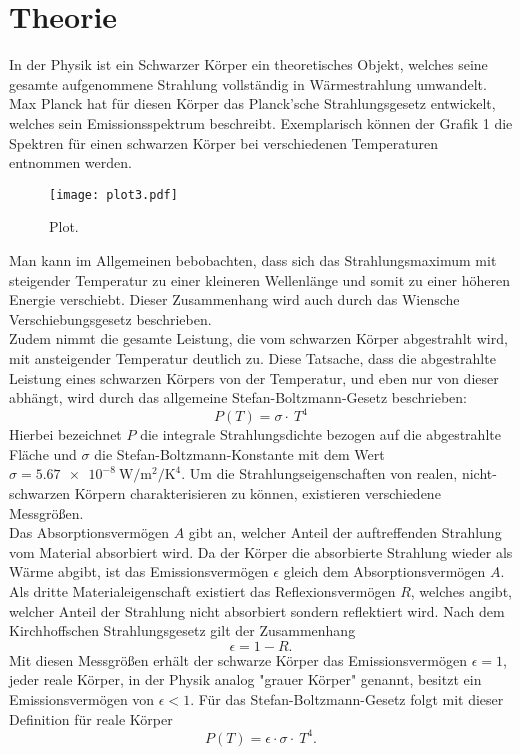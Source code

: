 \section{Theorie}
\label{sec:Theorie}
In der Physik ist ein Schwarzer Körper ein theoretisches Objekt, welches seine gesamte aufgenommene Strahlung vollständig in Wärmestrahlung umwandelt.
Max Planck hat für diesen Körper das Planck'sche Strahlungsgesetz entwickelt, welches sein Emissionsspektrum beschreibt.
Exemplarisch können der Grafik 1 die Spektren für einen schwarzen Körper bei verschiedenen Temperaturen entnommen werden.
\begin{figure}[H]
  \centering
  \texttt{[image: plot3.pdf]}
  \caption{Plot.}
  \label{fig:plot}
\end{figure}
Man kann im Allgemeinen bebobachten, dass sich das Strahlungsmaximum mit steigender Temperatur zu einer kleineren Wellenlänge und somit zu einer höheren Energie verschiebt.
Dieser Zusammenhang wird auch durch das Wiensche Verschiebungsgesetz beschrieben.\\
Zudem nimmt die gesamte Leistung, die vom schwarzen Körper abgestrahlt wird, mit ansteigender Temperatur deutlich zu.
Diese Tatsache, dass die abgestrahlte Leistung eines schwarzen Körpers von der Temperatur, und eben nur von dieser abhängt, wird durch das allgemeine Stefan-Boltzmann-Gesetz beschrieben:
\begin{equation}
  P(T) = \sigma \cdot \ T^4
\end{equation}
Hierbei bezeichnet $P$ die integrale Strahlungsdichte bezogen auf die abgestrahlte Fläche und $\sigma$ die Stefan-Boltzmann-Konstante mit dem Wert $\sigma = \SI{5.67e-8}{\watt\per\metre\tothe{2}\per\kelvin\tothe{4}}$.
Um die Strahlungseigenschaften von realen, nicht-schwarzen Körpern charakterisieren zu können, existieren verschiedene Messgrößen.\\
Das Absorptionsvermögen $A$ gibt an, welcher Anteil der auftreffenden Strahlung vom Material absorbiert wird.
Da der Körper die absorbierte Strahlung wieder als Wärme abgibt, ist das Emissionsvermögen $\epsilon$ gleich dem Absorptionsvermögen $A$.
Als dritte Materialeigenschaft existiert das Reflexionsvermögen $R$, welches angibt, welcher Anteil der Strahlung nicht absorbiert sondern reflektiert wird.
Nach dem Kirchhoffschen Strahlungsgesetz gilt der Zusammenhang
\begin{equation}
  \epsilon = 1-R.
\end{equation}
Mit diesen Messgrößen erhält der schwarze Körper das Emissionsvermögen $\epsilon = 1$, jeder reale Körper, in der Physik analog "grauer Körper" genannt, besitzt ein Emissionsvermögen von $\epsilon < 1$.
Für das Stefan-Boltzmann-Gesetz folgt mit dieser Definition für reale Körper
\begin{equation}
  P(T) = \epsilon \cdot \sigma \cdot \ T^4.
\end{equation}

\cite{sample}
